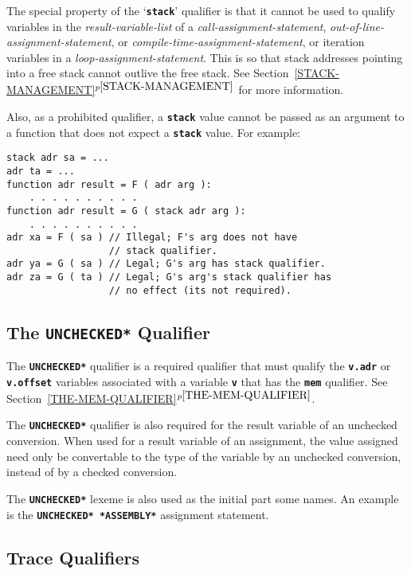 \documentclass[12pt]{article}
\newcommand{\TT}[1]{{\tt \bfseries #1}}
\newcommand{\itemref}[1]{\ref{#1}$^{p\pageref{#1}}$}
\newenvironment{indpar}[1][0.3in]%
	{\begin{list}{}%
		     {\setlength{\itemsep}{0in}%
		      \setlength{\topsep}{0in}%
		      \setlength{\parsep}{1ex}%
		      \setlength{\labelwidth}{#1}%
		      \setlength{\leftmargin}{#1}%
		      \addtolength{\leftmargin}{\labelsep}}%
	 \item}%
	{\end{list}}
\begin{document}
The special property of the `\TT{stack}' qualifier is that it cannot
be used to qualify variables in the {\em result-variable-list}
of a {\em call-assignment-statement},
{\em out-of-line-assignment-statement}, or
{\em compile-time-assignment-statement},
or iteration variables in a {\em loop-assignment-statement}.
This is so that stack addresses pointing into a free stack
cannot outlive the free stack.
See Section~\itemref{STACK-MANAGEMENT} for more information.

Also, as a prohibited qualifier, a \TT{stack} value cannot be
passed as an argument to a function that does not expect a
\TT{stack} value.  For example:
\begin{indpar}\begin{verbatim}
stack adr sa = ...
adr ta = ...
function adr result = F ( adr arg ):
    . . . . . . . . . .
function adr result = G ( stack adr arg ):
    . . . . . . . . . .
adr xa = F ( sa ) // Illegal; F's arg does not have
                  // stack qualifier.
adr ya = G ( sa ) // Legal; G's arg has stack qualifier.
adr za = G ( ta ) // Legal; G's arg's stack qualifier has
                  // no effect (its not required).
\end{verbatim}\end{indpar}

\subsection{The \TT{*UNCHECKED*} Qualifier}
\label{THE-UNCHECKED-QUALIFIER}

The \TT{*UNCHECKED*} qualifier is a
required qualifier that must qualify the \TT{v.adr} or
\TT{v.offset} variables
associated with a variable \TT{v} that has the \TT{mem} qualifier.
See Section~\itemref{THE-MEM-QUALIFIER}.

The \TT{*UNCHECKED*} qualifier is also required for the result variable
of an unchecked conversion.  When used for a result variable of an
assignment, the value assigned need only be convertable to the type
of the variable by an unchecked conversion, instead of by a checked
conversion.

The \TT{*UNCHECKED*} lexeme is also used as the initial part some
names. An example is the \TT{*UNCHECKED* *ASSEMBLY*} assignment statement.

\subsection{Trace Qualifiers}
\label{TRACE-QUALIFIERS}
\end{document}
